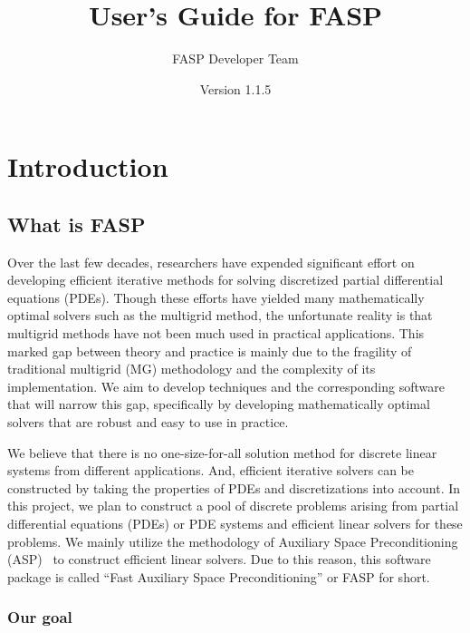 \documentclass[11pt]{memoir}
\title{User's Guide for FASP}
\author{FASP Developer Team}
\date{Version 1.1.5} %
\begin{document}
\maketitle

\newpage
\tableofcontents

\chapter{Introduction}\label{ch:intro}

\section{What is FASP}\label{sec:goal}

Over the last few decades, researchers have expended significant effort on developing efficient iterative methods for solving discretized partial differential equations (PDEs). Though these efforts have yielded many mathematically optimal solvers such as the multigrid method, the unfortunate reality is that multigrid methods have not been much used in practical applications. This marked gap between theory and practice is mainly due to the fragility of traditional multigrid (MG) methodology and the complexity of its implementation. We aim to develop techniques and the corresponding software that will narrow this gap, specifically by developing mathematically optimal solvers that are robust and easy to use in practice. 

We believe that there is no one-size-for-all solution method for discrete linear systems from different applications. And, efficient iterative solvers can be constructed by taking the properties of PDEs and discretizations into account. In this project, we plan to construct a pool of discrete problems arising from partial differential equations (PDEs) or PDE systems and efficient linear solvers for these problems. We mainly utilize the methodology of Auxiliary Space Preconditioning (ASP)~\cite{Xu.Xu.2010ff} to construct efficient linear solvers. Due to this reason, this software package is called ``Fast Auxiliary Space Preconditioning'' or FASP for short. 

\subsection{Our goal}
\end{document}
